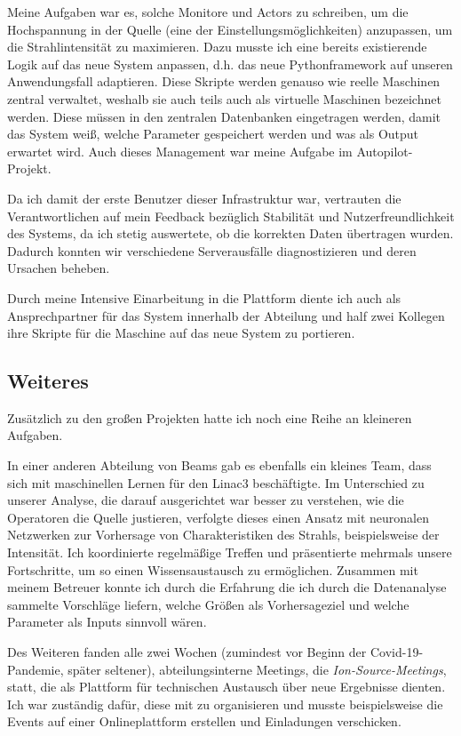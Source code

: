 \documentclass[11pt, a4paper, titlepage, headings=standardclasses]{scrartcl}
\begin{document}
Meine Aufgaben war es, solche Monitore und Actors zu schreiben, um die Hochspannung in der Quelle (eine der Einstellungsmöglichkeiten) anzupassen, um die Strahlintensität zu maximieren. Dazu musste ich eine bereits existierende Logik auf das neue System anpassen, d.h. das neue Pythonframework auf unseren Anwendungsfall adaptieren. Diese Skripte werden genauso wie reelle Maschinen zentral verwaltet, weshalb sie auch teils auch als virtuelle Maschinen bezeichnet werden. Diese müssen in den zentralen Datenbanken eingetragen werden, damit das System weiß, welche Parameter gespeichert werden und was als Output erwartet wird. Auch dieses Management war meine Aufgabe im Autopilot-Projekt.

Da ich damit der erste Benutzer dieser Infrastruktur war, vertrauten die Verantwortlichen auf mein Feedback bezüglich Stabilität und Nutzerfreundlichkeit des Systems, da ich stetig auswertete, ob die korrekten Daten übertragen wurden. Dadurch konnten wir verschiedene Serverausfälle diagnostizieren und deren Ursachen beheben.

Durch meine Intensive Einarbeitung in die Plattform diente ich auch als Ansprechpartner für das System innerhalb der Abteilung und half zwei Kollegen ihre Skripte für die Maschine auf das neue System zu portieren.

\subsection*{Weiteres}

Zusätzlich zu den großen Projekten hatte ich noch eine Reihe an kleineren Aufgaben.

In einer anderen Abteilung von Beams gab es ebenfalls ein kleines Team, dass sich mit maschinellen Lernen für den Linac3 beschäftigte. Im Unterschied zu unserer Analyse, die darauf ausgerichtet war besser zu verstehen, wie die Operatoren die Quelle justieren, verfolgte dieses einen Ansatz mit neuronalen Netzwerken zur Vorhersage von Charakteristiken des Strahls, beispielsweise der Intensität. Ich koordinierte regelmäßige Treffen und präsentierte mehrmals unsere Fortschritte, um so einen Wissensaustausch zu ermöglichen. Zusammen mit meinem Betreuer konnte ich durch die Erfahrung die ich durch die Datenanalyse sammelte Vorschläge liefern, welche Größen als Vorhersageziel und welche Parameter als Inputs sinnvoll wären.

Des Weiteren fanden alle zwei Wochen (zumindest vor Beginn der Covid-19-Pandemie, später seltener), abteilungsinterne Meetings, die \textit{Ion-Source-Meetings}, statt, die als Plattform für technischen Austausch über neue Ergebnisse dienten. Ich war zuständig dafür, diese mit zu organisieren und musste beispielsweise die Events auf einer Onlineplattform erstellen und Einladungen verschicken.
\end{document}
